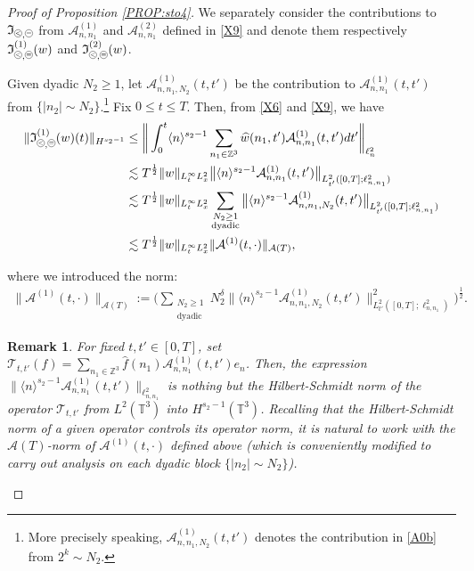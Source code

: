 \documentclass[%
11pt,  reqno]{amsart}
\newcommand{\pe}{\mathbin{\scaleobj{0.7}{\tikz \draw (0,0) node[shape=circle,draw,inner sep=0pt,minimum size=8.5pt] {\scriptsize  $=$};}}}
\newcommand{\pl}{\mathbin{\scaleobj{0.7}{\tikz \draw (0,0) node[shape=circle,draw,inner sep=0pt,minimum size=8.5pt] {\scriptsize $<$};}}}
\newtheorem{remark}[theorem]{Remark}
\newcommand{\1}{\hspace{0.2mm}\text{I}\hspace{0.2mm}}
\newcommand{\noi}{\noindent}
\newcommand{\Z}{\mathbb{Z}}
\newcommand{\T}{\mathbb{T}}
\newcommand{\dl}{\delta}
\newcommand{\ft}{\widehat}
\renewcommand{\l}{\ell}
\newcommand{\les}{\lesssim}
\newcommand{\jb}[1]
{\langle #1 \rangle}
\newcommand{\If}{\mathfrak{I}}
\newcommand{\A}{\mathcal{A}}
\numberwithin{equation}{section}
\numberwithin{theorem}{section}
\begin{document}
\begin{proof}[Proof of Proposition \ref{PROP:sto4}]

We separately consider the contributions to $\If_{\pl, \pe}$
from $\A^{(1)}_{n, n_1}$ and $\A^{(2)}_{n, n_1}$ defined in \eqref{X9} and denote them respectively
$\If_{\pl, \pe}^{(1)}(w)$  and $\If_{\pl, \pe}^{(2)}(w)$. 





Given dyadic $N_2 \geq 1$, 
let $\A_{n, n_1, N_2}^{(1)}(t, t')$
be 
the contribution 
to $\A_{n, n_1}^{(1)} (t, t')$ from $\big\{|n_2| \sim N_2\big\}$.\footnote{More precisely speaking, 
$\A_{n, n_1, N_2}^{(1)}(t, t')$
denotes the contribution in \eqref{A0b}
from $2^k \sim N_2$.}
Fix $0 \leq t \leq T$.
Then, 
from \eqref{X6}  and \eqref{X9}, we have
\begin{align*}
\begin{split}
\|\If_{\pl, \pe}^{(1)}(w)(t) \|_{H^{s_2 - 1}}
& \le \bigg\|\int_0^t 
\jb{n}^{s_2-1}\sum_{n_1 \in \Z^3}
\ft w(n_1, t') \A_{n, n_1}^{(1)}(t, t') dt'
\bigg\|_{\l^2_n}\\
& \les T^\frac{1}{2}  \|w\|_{L^\infty_t L^2_x}
\big\|\jb{n}^{s_2-1}
\A_{n, n_1}^{(1)} (t, t')
\big\|_{ L^2_{t'}([0, T]; \l^2_{n, n_1})}\\
%
& \les T^\frac{1}{2}  \|w\|_{L^\infty_t L^2_x}\sum_{\substack{N_2\geq 1\\ \text{dyadic}}}
\big\|\jb{n}^{s_2-1}
\A_{n, n_1, N_2}^{(1)} (t, t')
\big\|_{ L^2_{t'}([0, T]; \l^2_{n, n_1})}\\
& \les T^\frac{1}{2}  \|w\|_{L^\infty_t L^2_x} \|\A^{(1)} (t, \cdot)\|_{\A(T)},
\end{split}
\end{align*}


\noi
where we introduced the norm:
\begin{align}
\|\A^{(1)} (t, \cdot)\|_{\A(T)}  := 
\bigg(
\sum_{\substack{N_2\geq 1\\ \text{dyadic}}} N_2^\dl
\big\|\jb{n}^{s_2-1}
\A_{n, n_1, N_2}^{(1)} (t, t')
\big\|^2_{ L^2_{t'}([0, T]; \l^2_{n, n_1})}\bigg)^{\frac12}.
\label{Aop}
\end{align}


\begin{remark}\rm
For fixed $t, t' \in [0, T]$, set  $\mathcal{T}_{t, t'}(f) = 
\sum_{n_1 \in \Z^3}
\ft f(n_1) \A_{n, n_1}^{(1)}(t, t')e_n$.
Then, 
the expression
$\big\|\jb{n}^{s_2-1}
\A_{n, n_1}^{(1)} (t, t')
\big\|_{  \l^2_{n, n_1}}$ is nothing but the Hilbert-Schmidt norm
of the operator $\mathcal{T}_{t, t'}$
from $L^2(\T^3)$ into $H^{s_2-1}(\T^3)$.
Recalling that the Hilbert-Schmidt norm of a given operator
controls its  operator norm, 
it is natural to work with 
 the $\A(T)$-norm 
of $\A^{(1)} (t, \cdot)$ defined above
(which is conveniently modified to carry out analysis on each dyadic
block $\{ |n_2|\sim N_2\}$).





\end{remark}
\end{proof}
\end{document}
